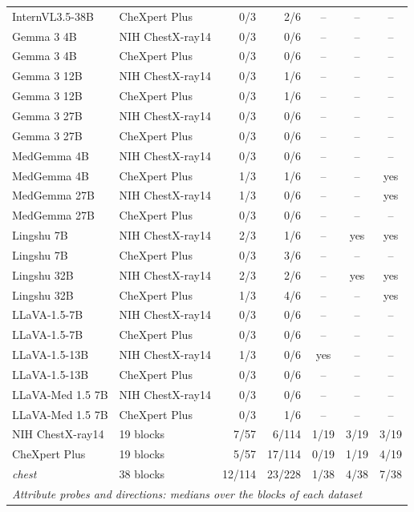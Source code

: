 \documentclass{article}
\begin{document}
\begin{table}[htbp]
{{{\begin{tabular}{llrrccc}
InternVL3.5-38B & CheXpert Plus & 0/3 & 2/6 & -- & -- & -- \\
Gemma 3 4B & NIH ChestX-ray14 & 0/3 & 0/6 & -- & -- & -- \\
Gemma 3 4B & CheXpert Plus & 0/3 & 0/6 & -- & -- & -- \\
Gemma 3 12B & NIH ChestX-ray14 & 0/3 & 1/6 & -- & -- & -- \\
Gemma 3 12B & CheXpert Plus & 0/3 & 1/6 & -- & -- & -- \\
Gemma 3 27B & NIH ChestX-ray14 & 0/3 & 0/6 & -- & -- & -- \\
Gemma 3 27B & CheXpert Plus & 0/3 & 0/6 & -- & -- & -- \\
MedGemma 4B & NIH ChestX-ray14 & 0/3 & 0/6 & -- & -- & -- \\
MedGemma 4B & CheXpert Plus & 1/3 & 1/6 & -- & -- & yes \\
MedGemma 27B & NIH ChestX-ray14 & 1/3 & 0/6 & -- & -- & yes \\
MedGemma 27B & CheXpert Plus & 0/3 & 0/6 & -- & -- & -- \\
Lingshu 7B & NIH ChestX-ray14 & 2/3 & 1/6 & -- & yes & yes \\
Lingshu 7B & CheXpert Plus & 0/3 & 3/6 & -- & -- & -- \\
Lingshu 32B & NIH ChestX-ray14 & 2/3 & 2/6 & -- & yes & yes \\
Lingshu 32B & CheXpert Plus & 1/3 & 4/6 & -- & -- & yes \\
LLaVA-1.5-7B & NIH ChestX-ray14 & 0/3 & 0/6 & -- & -- & -- \\
LLaVA-1.5-7B & CheXpert Plus & 0/3 & 0/6 & -- & -- & -- \\
LLaVA-1.5-13B & NIH ChestX-ray14 & 1/3 & 0/6 & yes & -- & -- \\
LLaVA-1.5-13B & CheXpert Plus & 0/3 & 0/6 & -- & -- & -- \\
LLaVA-Med 1.5 7B & NIH ChestX-ray14 & 0/3 & 0/6 & -- & -- & -- \\
LLaVA-Med 1.5 7B & CheXpert Plus & 0/3 & 1/6 & -- & -- & -- \\
\midrule
NIH ChestX-ray14 & 19 blocks & 7/57 & 6/114 & 1/19 & 3/19 & 3/19 \\
CheXpert Plus & 19 blocks & 5/57 & 17/114 & 0/19 & 1/19 & 4/19 \\
\textit{chest} & 38 blocks & 12/114 & 23/228 & 1/38 & 4/38 & 7/38 \\
\midrule
\multicolumn{7}{l}{\textit{Attribute probes and directions: medians over the blocks of each dataset}} \\

\end{tabular}}}}
\end{table}
\end{document}
